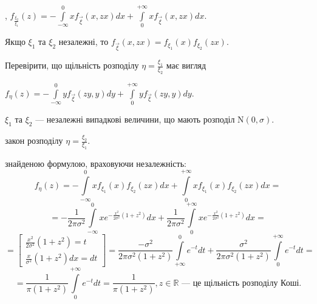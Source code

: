 , $f_{\frac{\xi_2}{\xi_1}} (z)= -\int\limits_{-\infty}^0 xf_{\vec{\xi}}(x, zx)dx + 
\int\limits_0^{+\infty}xf_{\vec{\xi}}(x, zx)dx$.

\begin{remark}
    Якщо $\xi_1$ та $\xi_2$ незалежні, то $f_{\vec{\xi}}(x, zx) = 
    f_{\xi_1}(x)f_{\xi_2}(zx)$.
\end{remark}

\begin{exercise}
    Перевірити, що щільність розподілу $\eta = \frac{\xi_1}{\xi_2}$ має вигляд

    \noindent$f_\eta(z) = -\int\limits_{-\infty}^0 y f_{\vec {\xi}}(zy, y) dy + \int\limits_0^{+\infty}
    yf_{\vec{\xi}}(zy, y)dy$.
\end{exercise}

\begin{example}
    $\xi_1$ та $\xi_2$ --- незалежні випадкові величини, що мають розподіл $\mathrm{N}(0, \sigma)$.
    
     закон розподілу $\eta = \frac{\xi_2}{\xi_1}$.

     знайденою формулою, враховуючи незалежність:
    \begin{equation*}
        f_\eta(z) = - \int\limits_{-\infty}^0 x f_{\xi_1}(x) f_{\xi_2}(zx) dx + 
        \int\limits_{0}^{+\infty} x f_{\xi_1}(x) f_{\xi_2}(zx) dx = 
    \end{equation*}
    \begin{equation*}
        =
        -\frac{1}{2\pi\sigma^2}\int\limits_{-\infty}^0 x e^{-\frac{x^2}{2\sigma^2}(1+z^2)} dx
        +
        \frac{1}{2\pi\sigma^2}\int\limits_0^{+\infty} x e^{-\frac{x^2}{2\sigma^2}(1+z^2)}dx = 
    \end{equation*}
    \begin{equation*}
        = \left[
        \begin{array}{c}
            \frac{x^2}{2\sigma^2}(1+z^2) = t \\
            \frac{x}{\sigma^2}(1+z^2)dx = dt 
        \end{array}
        \right]
        =
        \frac{-\sigma^2}{2\pi\sigma^2(1+z^2)}\int\limits_{+\infty}^0 e^{-t} dt
        +
        \frac{\sigma^2}{2\pi\sigma^2(1+z^2)}\int\limits^{+\infty}_0 e^{-t} dt = 
    \end{equation*}
    \begin{equation*}
        = \frac{1}{\pi(1+z^2)}\int\limits_0^{+\infty}e^{-t}dt = \frac{1}{\pi(1+z^2)}, z \in \mathbb{R}
        \text{ --- це щільність розподілу Коші.}
    \end{equation*}
\end{example}

